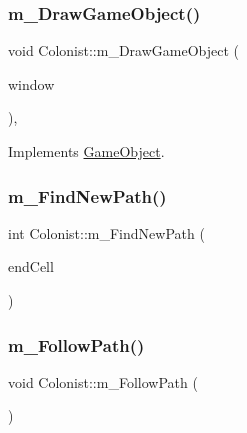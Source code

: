 \mbox{\label{class_colonist_ae7d7c74ff639334e6992142c01dd8f6f}} 
\subsubsection{\texorpdfstring{m\+\_\+\+Draw\+Game\+Object()}{m\_DrawGameObject()}}
{\footnotesize\ttfamily void Colonist\+::m\+\_\+\+Draw\+Game\+Object (\begin{DoxyParamCaption}\item[{sf\+::\+Render\+Window \&}]{window }\end{DoxyParamCaption})\hspace{0.3cm}{\ttfamily [override]}, {\ttfamily [virtual]}}



Implements \mbox{\hyperlink{class_game_object_a184ac59fd5167c55a54b50894e5b6721}{Game\+Object}}.

\mbox{\label{class_colonist_a81892e1468ec705e99ba71c6e9ae3da3}} 
\subsubsection{\texorpdfstring{m\+\_\+\+Find\+New\+Path()}{m\_FindNewPath()}}
{\footnotesize\ttfamily int Colonist\+::m\+\_\+\+Find\+New\+Path (\begin{DoxyParamCaption}\item[{\mbox{\hyperlink{class_cells}{Cells}} $\ast$}]{end\+Cell }\end{DoxyParamCaption})}

\mbox{\label{class_colonist_a350c571eddc4b145e0d05cce1668f76c}} 
\subsubsection{\texorpdfstring{m\+\_\+\+Follow\+Path()}{m\_FollowPath()}}
{\footnotesize\ttfamily void Colonist\+::m\+\_\+\+Follow\+Path (\begin{DoxyParamCaption}{ }\end{DoxyParamCaption})}

